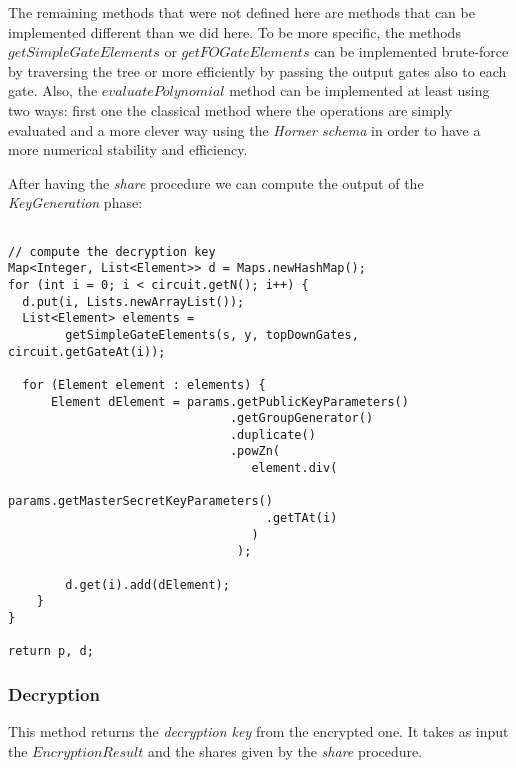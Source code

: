 \documentclass[12pt]{article}
\begin{document}
The remaining methods that were not defined here are methods that can be implemented different than we did here. To be more specific, the methods $getSimpleGateElements$ or $getFOGateElements$ can be implemented brute-force by traversing the tree or more efficiently by passing the output gates also to each gate. Also, the $evaluatePolynomial$ method can be implemented at least using two ways: first one the classical method where the operations are simply evaluated and a more clever way using the \textit{Horner schema} in order to have a more numerical stability and efficiency.

After having the \textit{share} procedure we can compute the output of the \textit{KeyGeneration} phase:

\begin{lstlisting}

// compute the decryption key
Map<Integer, List<Element>> d = Maps.newHashMap();
for (int i = 0; i < circuit.getN(); i++) {
  d.put(i, Lists.newArrayList());
  List<Element> elements = 
        getSimpleGateElements(s, y, topDownGates, circuit.getGateAt(i));
  
  for (Element element : elements) {
      Element dElement = params.getPublicKeyParameters()
                               .getGroupGenerator()
                               .duplicate()
                               .powZn(
                                  element.div(
                                    params.getMasterSecretKeyParameters()
                                    .getTAt(i)
                                  )
                                );

        d.get(i).add(dElement);
    }
}

return p, d;
\end{lstlisting}

\subsubsection{Decryption}

This method returns the \textit{decryption key} from the encrypted one. It takes as input the $EncryptionResult$ and the shares given by the \textit{share} procedure. 
\end{document}
